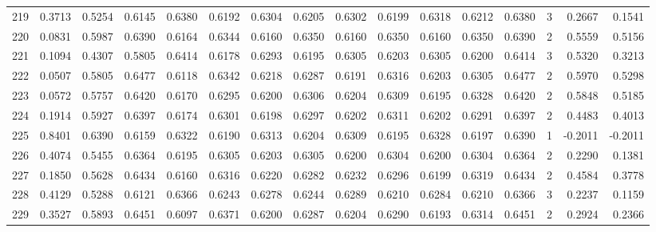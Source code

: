 \begin{tabular}{lrrrrrrrrrrrrrrr}
219 &      0.3713 &  0.5254 &  0.6145 &  0.6380 &  0.6192 &  0.6304 &  0.6205 &  0.6302 &  0.6199 &  0.6318 &   0.6212 &     0.6380 &      3 &                    0.2667 &                     0.1541 \\
220 &      0.0831 &  0.5987 &  0.6390 &  0.6164 &  0.6344 &  0.6160 &  0.6350 &  0.6160 &  0.6350 &  0.6160 &   0.6350 &     0.6390 &      2 &                    0.5559 &                     0.5156 \\
221 &      0.1094 &  0.4307 &  0.5805 &  0.6414 &  0.6178 &  0.6293 &  0.6195 &  0.6305 &  0.6203 &  0.6305 &   0.6200 &     0.6414 &      3 &                    0.5320 &                     0.3213 \\
222 &      0.0507 &  0.5805 &  0.6477 &  0.6118 &  0.6342 &  0.6218 &  0.6287 &  0.6191 &  0.6316 &  0.6203 &   0.6305 &     0.6477 &      2 &                    0.5970 &                     0.5298 \\
223 &      0.0572 &  0.5757 &  0.6420 &  0.6170 &  0.6295 &  0.6200 &  0.6306 &  0.6204 &  0.6309 &  0.6195 &   0.6328 &     0.6420 &      2 &                    0.5848 &                     0.5185 \\
224 &      0.1914 &  0.5927 &  0.6397 &  0.6174 &  0.6301 &  0.6198 &  0.6297 &  0.6202 &  0.6311 &  0.6202 &   0.6291 &     0.6397 &      2 &                    0.4483 &                     0.4013 \\
225 &      0.8401 &  0.6390 &  0.6159 &  0.6322 &  0.6190 &  0.6313 &  0.6204 &  0.6309 &  0.6195 &  0.6328 &   0.6197 &     0.6390 &      1 &                   -0.2011 &                    -0.2011 \\
226 &      0.4074 &  0.5455 &  0.6364 &  0.6195 &  0.6305 &  0.6203 &  0.6305 &  0.6200 &  0.6304 &  0.6200 &   0.6304 &     0.6364 &      2 &                    0.2290 &                     0.1381 \\
227 &      0.1850 &  0.5628 &  0.6434 &  0.6160 &  0.6316 &  0.6220 &  0.6282 &  0.6232 &  0.6296 &  0.6199 &   0.6319 &     0.6434 &      2 &                    0.4584 &                     0.3778 \\
228 &      0.4129 &  0.5288 &  0.6121 &  0.6366 &  0.6243 &  0.6278 &  0.6244 &  0.6289 &  0.6210 &  0.6284 &   0.6210 &     0.6366 &      3 &                    0.2237 &                     0.1159 \\
229 &      0.3527 &  0.5893 &  0.6451 &  0.6097 &  0.6371 &  0.6200 &  0.6287 &  0.6204 &  0.6290 &  0.6193 &   0.6314 &     0.6451 &      2 &                    0.2924 &                     0.2366 \\

\end{tabular}
